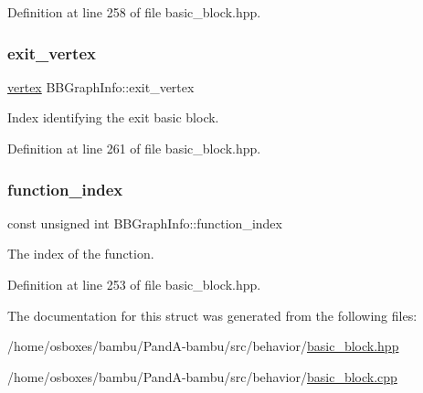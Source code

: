Definition at line 258 of file basic\+\_\+block.\+hpp.

\mbox{\label{structBBGraphInfo_a51063a00b38624c4c1ddcb0226fa1e0c}} 
\subsubsection{\texorpdfstring{exit\+\_\+vertex}{exit\_vertex}}
{\footnotesize\ttfamily \hyperlink{graph_8hpp_abefdcf0544e601805af44eca032cca14}{vertex} B\+B\+Graph\+Info\+::exit\+\_\+vertex}



Index identifying the exit basic block. 



Definition at line 261 of file basic\+\_\+block.\+hpp.

\mbox{\label{structBBGraphInfo_a3ffe0930d57fc4eda012d102d6594b00}} 
\subsubsection{\texorpdfstring{function\+\_\+index}{function\_index}}
{\footnotesize\ttfamily const unsigned int B\+B\+Graph\+Info\+::function\+\_\+index}



The index of the function. 



Definition at line 253 of file basic\+\_\+block.\+hpp.



The documentation for this struct was generated from the following files\+:\begin{DoxyCompactItemize}
\item 
/home/osboxes/bambu/\+Pand\+A-\/bambu/src/behavior/\hyperlink{basic__block_8hpp}{basic\+\_\+block.\+hpp}\item 
/home/osboxes/bambu/\+Pand\+A-\/bambu/src/behavior/\hyperlink{basic__block_8cpp}{basic\+\_\+block.\+cpp}\end{DoxyCompactItemize}
